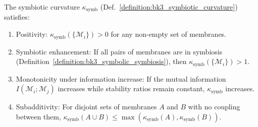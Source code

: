 \begin{theorem} \label{theorem:bk3_properties_of_symbiotic_curvature}
The symbiotic curvature $\kappa_{\text{symb}}$ (Def.~\ref{definition:bk3_symbiotic_curvature}) satisfies:
\begin{enumerate}
    \item Positivity: $\kappa_{\text{symb}}(\{\mathcal{M}_i\}) > 0$ for any non-empty set of membranes.
    \item Symbiotic enhancement: If all pairs of membranes are in symbiosis (Definition~\ref{definition:bk3_symbolic_symbiosis}), then $\kappa_{\text{symb}}(\{\mathcal{M}_i\}) > 1$.
    \item Monotonicity under information increase: If the mutual information $I(\mathcal{M}_i; \mathcal{M}_j)$ increases while stability ratios remain constant, $\kappa_{\text{symb}}$ increases.
    \item Subadditivity: For disjoint sets of membranes $A$ and $B$ with no coupling between them, $\kappa_{\text{symb}}(A \cup B) \leq \max(\kappa_{\text{symb}}(A), \kappa_{\text{symb}}(B))$.
\end{enumerate}
\end{theorem}

